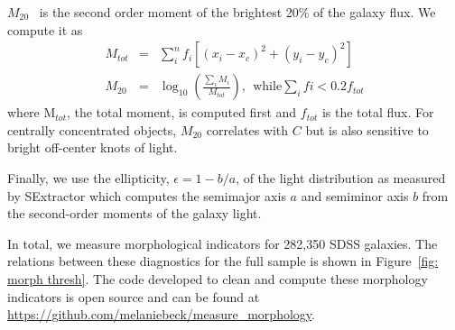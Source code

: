 \documentclass[twocolumn]{aastex6}
\newcommand{\M}[1]{$M_{#1}$}
\begin{document}
\M{20}~\citep{Lotz2004} is the second order moment of the brightest 20\% of the galaxy flux. We compute it as
\begin{eqnarray}
 M_{tot} & = & \sum_i^nf_i[(x_i-x_c)^2 + (y_i-y_c)^2]  \\
 M_{20} & = & \log_{10} (\frac{\sum_iM_i}{M_{tot}}), ~~\textrm{while} \sum_ifi < 0.2f_{tot}
\end{eqnarray}
where M$_{tot}$, the total moment, is computed first and $f_{tot}$ is the total flux. For centrally concentrated objects, \M{20} correlates with $C$ but is also sensitive to bright off-center knots of light. 

Finally, we use the ellipticity, $\epsilon = 1 - b/a$, of the light distribution as measured by SExtractor which computes the semimajor axis $a$ and semiminor axis $b$ from the second-order moments of the galaxy light.  

In total, we measure morphological indicators for 282,350 SDSS galaxies. The relations between these diagnostics for the full sample is shown in Figure~\ref{fig: morph thresh}. The code developed to clean and compute these morphology indicators is open source and can be found at \url{https://github.com/melaniebeck/measure_morphology}.
\end{document}

